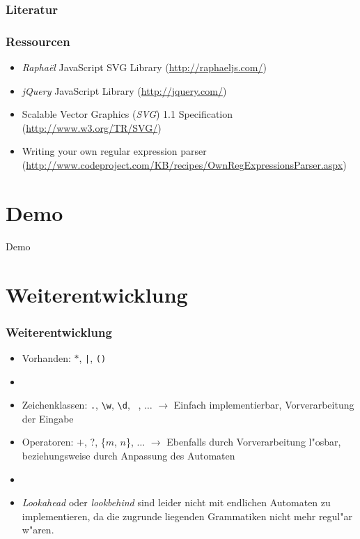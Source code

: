 \documentclass[ignorenonframetext]{beamer}
\begin{document}
\begin{frame}[allowframebreaks]
    \frametitle{Literatur}
    
    
    \nocite{*}
\end{frame}

\begin{frame}
    \frametitle{Ressourcen}

    \begin{itemize}
        \item \textit{Rapha\"el} JavaScript SVG Library (\url{http://raphaeljs.com/})
        \item \textit{jQuery} JavaScript Library (\url{http://jquery.com/})
        \item Scalable Vector Graphics (\textit{SVG}) 1.1 Specification (\url{http://www.w3.org/TR/SVG/})
        \item Writing your own regular expression parser (\url{http://www.codeproject.com/KB/recipes/OwnRegExpressionsParser.aspx})
    \end{itemize}
\end{frame}


\section{Demo}
\begin{frame}[plain]
    \begin{center}
        \Huge{Demo}
    \end{center}
\end{frame}


\section{Weiterentwicklung}
\begin{frame}
    \frametitle{Weiterentwicklung}

    \begin{itemize}
        \item Vorhanden: $*$, \texttt{|}, \texttt{()}
        \item[]
        \item Zeichenklassen: \texttt{.}, \texttt{\textbackslash w}, \texttt{\textbackslash d},  \lbrack\ \rbrack, $\hdots$ $\rightarrow$ Einfach implementierbar, Vorverarbeitung der Eingabe
        \item Operatoren: $+$, ?, \{$m$, $n$\}, $\hdots$ $\rightarrow$ Ebenfalls durch Vorverarbeitung l"osbar, beziehungsweise durch Anpassung des Automaten
        \item[]
        \item \textit{Lookahead} oder \textit{lookbehind} sind leider nicht mit endlichen Automaten zu implementieren, da die zugrunde liegenden Grammatiken nicht mehr regul"ar w"aren.
    \end{itemize}
\end{frame}
\end{document}
